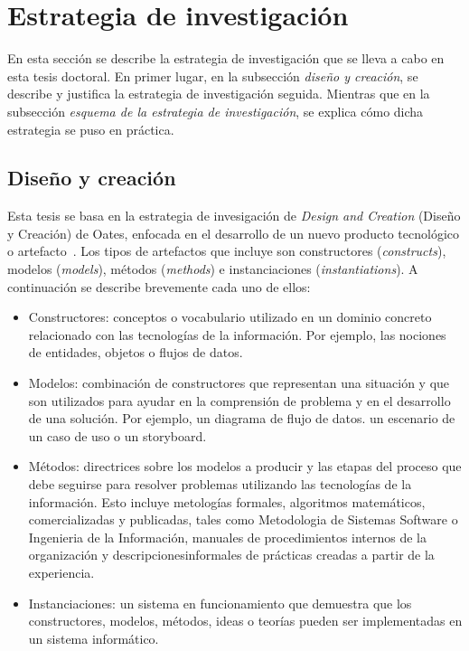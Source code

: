 
\section{Estrategia de investigación}
\label{sec:EstrategiaInvestigacion}

En esta sección se describe la estrategia de investigación que se lleva a cabo en esta tesis doctoral. En primer lugar, en la subsección \emph{diseño y creación}, se describe y justifica  la estrategia de investigación seguida. Mientras que en la subsección \emph{esquema de la estrategia de investigación}, se explica cómo dicha estrategia se puso en práctica. 

\subsection{Diseño y creación} %

Esta tesis se basa en la estrategia de invesigación de \emph{Design and Creation} (Diseño y Creación) de Oates, enfocada en el desarrollo de un nuevo producto tecnológico o artefacto~\cite{oates2006researching}. Los tipos de artefactos que incluye son constructores (\emph{constructs}), modelos (\emph{models}), métodos (\emph{methods}) e instanciaciones (\emph{instantiations}). A continuación se describe brevemente cada uno de ellos:

\begin{itemize}
\item Constructores: conceptos o vocabulario utilizado en un dominio concreto relacionado con las tecnologías de la información. Por ejemplo, las nociones de entidades, objetos o flujos de datos. 
\item Modelos: combinación de constructores que representan una situación y que son utilizados para ayudar en la comprensión de problema y en el desarrollo de una solución. Por ejemplo, un diagrama de flujo de datos. un escenario de un caso de uso o un storyboard.
\item Métodos: directrices sobre los modelos a producir y las etapas del proceso que debe seguirse para resolver problemas utilizando las tecnologías de la información. Esto incluye metologías formales, algoritmos matemáticos, comercializadas y publicadas, tales como Metodologia de Sistemas Software o Ingenieria de la Información, manuales de procedimientos internos de la organización y descripcionesinformales de prácticas creadas a partir de la experiencia.
\item Instanciaciones: un sistema en funcionamiento que demuestra que los constructores, modelos, métodos, ideas o teorías pueden ser implementadas en un sistema informático.
\end{itemize}

